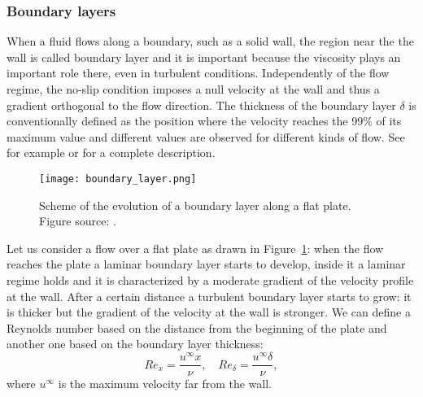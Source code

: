 \subsubsection{Boundary layers} \label{subsec:bl}
When a fluid flows along a boundary, such as a solid wall, the region near the 
the wall is called boundary layer and it is important because the 
viscosity plays an important role there, even in turbulent conditions.
Independently of the flow regime, the no-slip condition imposes a null velocity 
at the wall and thus a gradient orthogonal to the flow direction. The thickness 
of the boundary layer $\delta$ is conventionally defined as the position where 
the velocity 
reaches the 99\% of its maximum value and different values are observed for 
different kinds of flow.  See for 
example \cite{main:pope} or \cite{main:davidson} for a complete description.
\begin{figure}
	\centering
	\texttt{[image: boundary\_layer.png]}
	\caption[Boundary layer along a flat plate]{Scheme of the evolution of a 
	boundary layer along a flat plate. Figure source: \cite{tesi:fetzer}.}
	\label{fig:bl}
\end{figure}

Let us consider a flow over a flat plate as drawn in Figure~\ref{fig:bl}: when 
the flow reaches the plate a laminar boundary layer starts to develop, inside 
it a laminar regime holds and it is characterized by a moderate gradient of the 
velocity profile at the wall. After a certain distance a turbulent boundary 
layer starts to grow: it is thicker but the gradient of the velocity at the 
wall is stronger. We can define a Reynolds number based on the distance from 
the beginning of the plate and another one based on the boundary layer 
thickness:
\begin{equation}
Re_x = \frac{u^\infty x}{\nu}, \quad Re_\delta = \frac{u^\infty 
	\delta}{\nu},
\end{equation}
where $u^\infty$ is the maximum velocity far from the wall.

